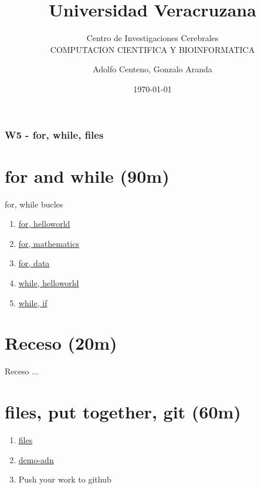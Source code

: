 \documentclass{beamer}
\begin{document}
\title{Universidad Veracruzana}  
\subtitle{Centro de Investigaciones Cerebrales\\COMPUTACION CIENTIFICA Y BIOINFORMATICA}
\author{Adolfo Centeno, Gonzalo Aranda}
\date{\today} 

\begin{frame}
\titlepage
\end{frame}

\begin{frame}\frametitle{W5 -  for, while, files }
\tableofcontents
\end{frame} 


\section{for and while (90m) }

\begin{frame}


for, while bucles

\begin{enumerate}
\item
	\href{https://github.com/adsoftsito/python/blob/master/w4/for-helloworld.py}{for, helloworld}

\item
	 \href{https://github.com/adsoftsito/python/blob/master/w4/for-math.py}{for, mathematics}
\item
	\href{https://github.com/adsoftsito/python/blob/master/w4/for-data.py}{for, data}

\item
	\href{https://github.com/adsoftsito/python/blob/master/w4/while-helloworld.py}{while, helloworld}

\item
	 \href{https://github.com/adsoftsito/python/blob/master/w4/while-conditional.py}{while, if}
	
\end{enumerate} 


\end{frame}


\section{Receso  (20m) }

\begin{frame}


Receso ...

\end{frame}


\section{files, put together,  git (60m) }

\begin{frame}

\begin{enumerate}
\item
	\href{https://github.com/adsoftsito/python/blob/master/w4/files.py}{files}

\item
	\href{https://github.com/adsoftsito/python/blob/master/w4/project1.py}{demo-adn}

\item
	Push your work to github

\end{enumerate} 


\end{frame}
\end{document}
